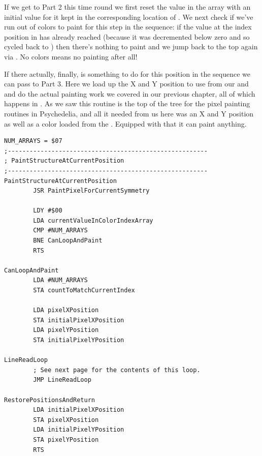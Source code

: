 If we get to Part 2 this time round we first reset the value in the  array with an initial value for it kept in the corresponding
location of . We next check if we've run out of colors to paint for this step
in the sequence: if the value at the index position in  has already reached  (because
it was decremented below zero and so cycled back to ) then there's nothing to paint and we jump back to the top
again via . No colors means no painting after all!

If there actually, finally, is something to do for this position in the sequence we can pass to Part 3. Here we load up the X and Y
position to use from our  and  and do the actual painting work we covered
in our previous chapter, all of which happens in . As we saw this routine is the top of the
tree for the pixel painting routines in Psychedelia, and all it needed from us here was an X and Y position as well as a color
loaded from the . Equipped with that it can paint anything. 

\clearpage
\begin{lstlisting}[caption = The routine responsible for orchestrating the pattern painting.]
NUM_ARRAYS = $07
;-------------------------------------------------------
; PaintStructureAtCurrentPosition
;-------------------------------------------------------
PaintStructureAtCurrentPosition   
        JSR PaintPixelForCurrentSymmetry

        LDY #$00
        LDA currentValueInColorIndexArray
        CMP #NUM_ARRAYS
        BNE CanLoopAndPaint
        RTS 

CanLoopAndPaint   
        LDA #NUM_ARRAYS
        STA countToMatchCurrentIndex
       
        LDA pixelXPosition
        STA initialPixelXPosition
        LDA pixelYPosition
        STA initialPixelYPosition

LineReadLoop   
        ; See next page for the contents of this loop.
        JMP LineReadLoop

RestorePositionsAndReturn   
        LDA initialPixelXPosition
        STA pixelXPosition
        LDA initialPixelYPosition
        STA pixelYPosition
        RTS 

\end{lstlisting}
\clearpage

